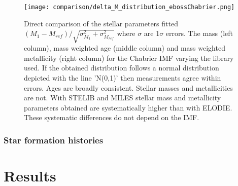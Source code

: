 \documentclass[onecolumn]{aa}
\begin{document}
\begin{figure*}
\begin{center}
\caption{\label{fig:comparison:library} 
Direct comparison of the stellar parameters fitted $(M_1-M_{ref})/\sqrt{\sigma^2_{M_1}+\sigma^2_{M_{ref}}}$ where $\sigma$ are 1$\sigma$ errors. The mass (left column), mass weighted age (middle column) and mass weighted metallicity (right column) for the Chabrier IMF varying the library used. 
If the obtained distribution follows a normal distribution depicted with the line 'N(0,1)' then measurements agree within errors. 
Ages are broadly consistent. 
Stellar masses and metallicities are not. 
With STELIB and MILES stellar mass and metallicity parameters obtained are systematically higher than with ELODIE. 
These systematic differences do not depend on the IMF.}  
\texttt{[image: comparison/delta\_M\_distribution\_ebossChabrier.png]}

\end{center}
\end{figure*}




\subsubsection{Star formation histories}
















\clearpage
\section{Results}
\label{sec:results}

\end{document}
